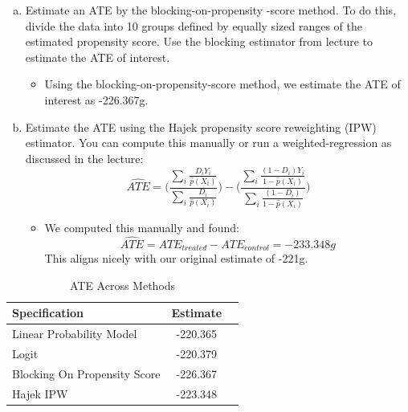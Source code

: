 \documentclass{article}
\begin{document}
\begin{enumerate}[(a)]
    \begin{itemize}
        \item Under the conditional independence assumption where the outcomes are independent on treatment conditioned with the propensity score, smoking mothers see a 220.379g reduction in birthweight compared to nonsmoking mothers.
    \end{itemize}
    \item Estimate an ATE by the blocking-on-propensity -score method. To do this, divide the data into 10 groups defined by equally sized ranges of the estimated propensity score. Use the blocking estimator from lecture to estimate the ATE of interest.
    \begin{itemize}
        \item Using the blocking-on-propensity-score method, we estimate the ATE of interest as -226.367g.
    \end{itemize}
    \item Estimate the ATE using the Hajek propensity score reweighting (IPW) estimator. You can compute this manually or run a weighted-regression as discussed in the lecture:
    \[\widehat{ATE} = \Bigg(\frac{\sum_i \frac{D_iY_i}{\hat p (X_i)}}{\sum_i \frac{D_i}{\hat p (X_i)}}\Bigg) - \Bigg(\frac{\sum_i \frac{(1 - D_i)Y_i}{1 - \hat p(X_i)}}{\sum_i\frac{(1 - D_i)}{1 - \hat p(X_i)}}\Bigg)\]
    \begin{itemize}
        \item We computed this manually and found:\[\widehat{ATE} = ATE_{treated} - ATE_{control} = -233.348g\]
        This aligns nicely with our original estimate of -221g.
    \end{itemize}
\end{enumerate}
        \begin{table}[h]
            \centering
            \caption{ATE Across Methods}
            \begin{tabular}{lcc}
            \hline
            \hline
            \textbf{Specification} & \textbf{Estimate}\\
            \hline
            Linear Probability Model & -220.365 \\
            Logit & -220.379 \\
            Blocking On Propensity Score & -226.367 \\
            Hajek IPW & -223.348 \\
            \hline
            \hline
            \end{tabular}
        \end{table}
\end{document}

